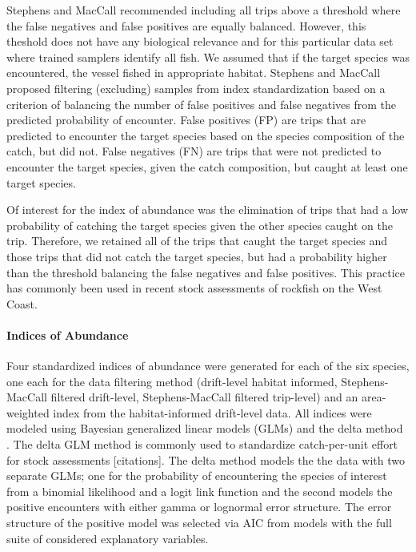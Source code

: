 \documentclass[
  authoryear,
  preprint,
  3p]{elsarticle}
\let\oldparagraph\paragraph
\renewcommand{\paragraph}[1]{\oldparagraph{#1}\mbox{}}
\begin{document}
Stephens and MacCall \citeyearpar{Stephens:2004:MAS} recommended
including all trips above a threshold where the false negatives and
false positives are equally balanced. However, this theshold does not
have any biological relevance and for this particular data set where
trained samplers identify all fish. We assumed that if the target
species was encountered, the vessel fished in appropriate habitat.
Stephens and MacCall \citeyearpar{Stephens:2004:MAS} proposed filtering
(excluding) samples from index standardization based on a criterion of
balancing the number of false positives and false negatives from the
predicted probability of encounter. False positives (FP) are trips that
are predicted to encounter the target species based on the species
composition of the catch, but did not. False negatives (FN) are trips
that were not predicted to encounter the target species, given the catch
composition, but caught at least one target species.

Of interest for the index of abundance was the elimination of trips that
had a low probability of catching the target species given the other
species caught on the trip. Therefore, we retained all of the trips that
caught the target species and those trips that did not catch the target
species, but had a probability higher than the threshold balancing the
false negatives and false positives. This practice has commonly been
used in recent stock assessments of rockfish on the West Coast.

\hypertarget{indices-of-abundance}{%
\paragraph{Indices of Abundance}\label{indices-of-abundance}}

Four standardized indices of abundance were generated for each of the
six species, one each for the data filtering method (drift-level habitat
informed, Stephens-MacCall filtered drift-level, Stephens-MacCall
filtered trip-level) and an area-weighted index from the
habitat-informed drift-level data. All indices were modeled using
Bayesian generalized linear models (GLMs) and the delta method
\citep{Lo:1992:IRA}. The delta GLM method is commonly used to
standardize catch-per-unit effort for stock assessments {[}citations{]}.
The delta method models the the data with two separate GLMs; one for the
probability of encountering the species of interest from a binomial
likelihood and a logit link function and the second models the positive
encounters with either gamma or lognormal error structure. The error
structure of the positive model was selected via AIC from models with
the full suite of considered explanatory variables.
\end{document}
